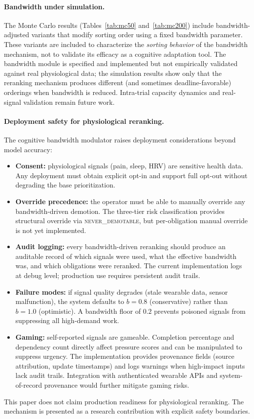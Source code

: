 \documentclass[11pt]{article}
\begin{document}
\paragraph{Bandwidth under simulation.}
The Monte Carlo results (Tables~\ref{tab:mc50} and~\ref{tab:mc200})
include bandwidth-adjusted variants that modify sorting order using
a fixed bandwidth parameter.  These variants are included to
characterize the \emph{sorting behavior} of the bandwidth mechanism,
not to validate its efficacy as a cognitive adaptation tool.
The bandwidth module is specified and implemented but not
empirically validated against real physiological data; the
simulation results show only that the reranking mechanism
produces different (and sometimes deadline-favorable) orderings
when bandwidth is reduced.
Intra-trial capacity dynamics and real-signal validation remain
future work.

\paragraph{Deployment safety for physiological reranking.}
The cognitive bandwidth modulator raises deployment considerations
beyond model accuracy:
\begin{itemize}[nosep]
  \item \textbf{Consent:} physiological signals (pain, sleep, HRV) are
    sensitive health data.  Any deployment must obtain explicit opt-in
    and support full opt-out without degrading the base prioritization.
  \item \textbf{Override precedence:} the operator must be able to
    manually override any bandwidth-driven demotion.  The three-tier
    risk classification provides structural override via
    \textsc{never\_demotable}, but per-obligation manual override
    is not yet implemented.
  \item \textbf{Audit logging:} every bandwidth-driven reranking should
    produce an auditable record of which signals were used, what the
    effective bandwidth was, and which obligations were reranked.
    The current implementation logs at debug level; production use
    requires persistent audit trails.
  \item \textbf{Failure modes:} if signal quality degrades (stale
    wearable data, sensor malfunction), the system defaults to
    $b = 0.8$ (conservative) rather than $b = 1.0$ (optimistic).
    A bandwidth floor of $0.2$ prevents poisoned signals from
    suppressing all high-demand work.
  \item \textbf{Gaming:} self-reported signals are gameable.
    Completion percentage and dependency count directly affect pressure
    scores and can be manipulated to suppress urgency.  The
    implementation provides provenance fields (source attribution,
    update timestamps) and logs warnings when high-impact inputs lack
    audit trails.  Integration with authenticated wearable APIs and
    system-of-record provenance would further mitigate gaming risks.
\end{itemize}
This paper does not claim production readiness for physiological
reranking.  The mechanism is presented as a research contribution
with explicit safety boundaries.
\end{document}
